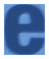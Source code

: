 \documentclass[a4paper]{article}
\begin{document}
\begin{enumerate}
\begin{enumerate}
\begin{figure}[H]
\begin{subfigure}[b]{.22\linewidth}
	            \includegraphics[width=\linewidth]{HW1-release/data/character_classification/new_images/12_E.jpg}
	        \end{subfigure}


\end{figure}
\end{enumerate}
\end{enumerate}
\end{document}
